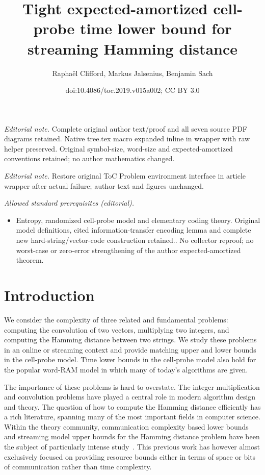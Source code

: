 \documentclass[11pt]{article}
\title{Tight expected-amortized cell-probe time lower bound for streaming Hamming distance}
\author{Raphaël Clifford, Markus Jalsenius, Benjamin Sach}
\date{doi:10.4086/toc.2019.v015a002; CC BY 3.0}
\numberwithin{equation}{section}
\theoremstyle{definition}
\theoremstyle{plain}
\begin{document}
\maketitle
\noindent\textit{Editorial note.} Complete original author text/proof and all seven source PDF diagrams retained. Native tree.tex macro expanded inline in wrapper with raw helper preserved. Original symbol-size, word-size and expected-amortized conventions retained; no author mathematics changed.\par\medskip
\noindent\textit{Editorial note.} Restore original ToC Problem environment interface in article wrapper after actual failure; author text and figures unchanged.\par\medskip
\noindent\textit{Allowed standard prerequisites (editorial).}\begin{itemize}
\item Entropy, randomized cell-probe model and elementary coding theory. Original model definitions, cited information-transfer encoding lemma and complete new hard-string/vector-code construction retained.. No collector reproof; no worst-case or zero-error strengthening of the author expected-amortized theorem.
\end{itemize}\medskip
\section{Introduction}


We consider the complexity of three related and fundamental problems: computing the convolution of two vectors, multiplying two integers, and computing the Hamming distance between two strings. We study these problems in an online or streaming context and provide matching upper and lower bounds in the cell-probe model.
Time lower bounds in the cell-probe model also hold for the popular word-RAM model in which many of today's algorithms are given. 

The importance of these problems is hard to overstate. The integer multiplication and convolution problems have played a central role in modern
%
algorithm
design and theory.  The question of how to compute the Hamming distance efficiently has a rich literature, spanning many of the most important fields in computer science. Within the theory community, communication complexity based lower bounds and streaming model upper bounds for the Hamming distance problem have been the subject of particularly intense study~\cite{CDIM:03,Woodruff:04,HSZZ:06,JKS:08,BCRT:10,Chakrabarti:11}. This previous work has however almost exclusively focused on providing resource bounds either in terms of space or bits of communication rather than time complexity.
\end{document}
